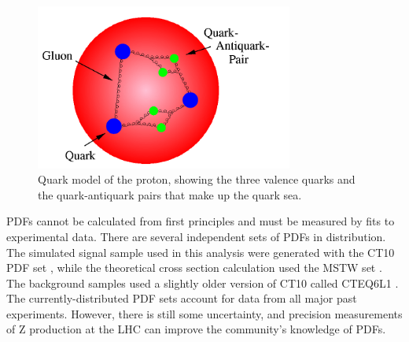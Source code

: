 
 \begin{figure}[htb]
  \begin{center}
    \includegraphics[width=240pt]{Figures/theory-quark-proton-naif-desy.png}
  \end{center}
  \caption[\fixspacing Quark model of proton]
	  {\fixspacing Quark model of the proton, 
	    showing the three valence quarks 
	    and the quark-antiquark pairs 
	    that make up the quark sea. 
	  }
  \label{fig:ProtonQuarkModel}
 \end{figure}



PDFs cannot be calculated from first 
principles and must be measured by fits 
to experimental data.  
There are several independent sets of PDFs 
in distribution.  
The simulated signal sample used in this analysis 
were generated with the CT10 PDF set \cite{CT10}, 
while the theoretical cross section calculation 
used the MSTW set \cite{MSTW}.  
The background samples used a slightly older 
version of CT10 called CTEQ6L1 \cite{CTEQ6L1}. 
The currently-distributed PDF sets 
account for data from all major past experiments.  
However, there is still some uncertainty, 
and precision measurements of Z production 
at the LHC can %
improve the community's knowledge of PDFs.  





